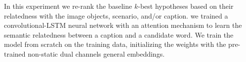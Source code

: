 \documentclass[phd,tocprelim]{cornell}
\begin{document}

In this experiment we re-rank the baseline $k$-best hypotheses based on their relatedness with the image objects, scenario, and/or caption. 
we trained a convolutional-LSTM neural network with an attention mechanism to learn the semantic relatedness between a caption and a candidate word. We train the model from scratch on the training data, initializing the weights with the pre-trained non-static dual channels general embeddings.   

\end{document}
